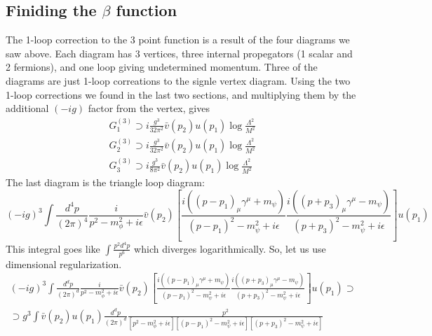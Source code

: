 \documentclass{article}
\begin{document}
\subsection{Finiding the $\beta$ function}
The 1-loop correction to the 3 point function is a result of the four diagrams we saw above. Each diagram has 3 vertices, three internal propegators (1 scalar and 2 fermions), and one loop giving undetermined momentum.
\newline
Three of the diagrams are just 1-loop correations to the signle vertex diagram. Using the two 1-loop corrections we found in the last two sections, and multiplying them by the additional $(-ig)$ factor from the vertex, gives
\begin{equation}
\begin{gathered}
    G^{(3)}_1 \supset i\frac{g^3}{32\pi^2}\bar{v}(p_2) u(p_1) \log \frac{\Lambda^2}{M^2}
    \\
    G^{(3)}_2 \supset i\frac{g^3}{32\pi^2}\bar{v}(p_2) u(p_1) \log \frac{\Lambda^2}{M^2}
    \\
    G^{(3)}_3 \supset i\frac{g^3}{8\pi^2}\bar{v}(p_2) u(p_1) \log \frac{\Lambda^2}{M^2}
\end{gathered}
\end{equation}
\newline
The last diagram is the triangle loop diagram:
\begin{equation}
    (-ig)^3\int \frac{d^4p}{(2\pi)^4}\frac{i}{p^2 - m_\phi^2 + i\epsilon} \bar{v}(p_2) \left[
        \frac{i((p - p_1)_\mu\gamma^\mu + m_\psi)}{(p - p_1)^2 - m_\psi^2 + i\epsilon}\frac{i((p + p_3)_\mu\gamma^\mu - m_\psi)}{(p + p_3)^2 - m_\psi^2 + i\epsilon}
    \right] u(p_1)
\end{equation}
This integral goes like $\int \frac{p^2 d^4p}{p^6}$ which diverges logarithmically. So, let us use dimensional regularization.
\begin{equation}
\begin{gathered}
    (-ig)^3\int \frac{d^dp}{(2\pi)^d}\frac{i}{p^2 - m_\phi^2 + i\epsilon} \bar{v}(p_2) \left[
        \frac{i((p - p_1)_\mu\gamma^\mu + m_\psi)}{(p - p_1)^2 - m_\psi^2 + i\epsilon}\frac{i((p + p_3)_\mu\gamma^\mu - m_\psi)}{(p + p_3)^2 - m_\psi^2 + i\epsilon}
    \right] u(p_1) \supset \\ \supset
    g^3\int \bar{v}(p_2) u(p_1)\frac{d^dp}{(2\pi)^d} \frac{p^2}{\left[p^2 - m_\phi^2 + i\epsilon\right]\left[(p - p_1)^2 - m_\psi^2 + i\epsilon\right]\left[(p + p_3)^2 - m_\psi^2 + i\epsilon\right]}
\end{gathered}
\end{equation}
\end{document}
